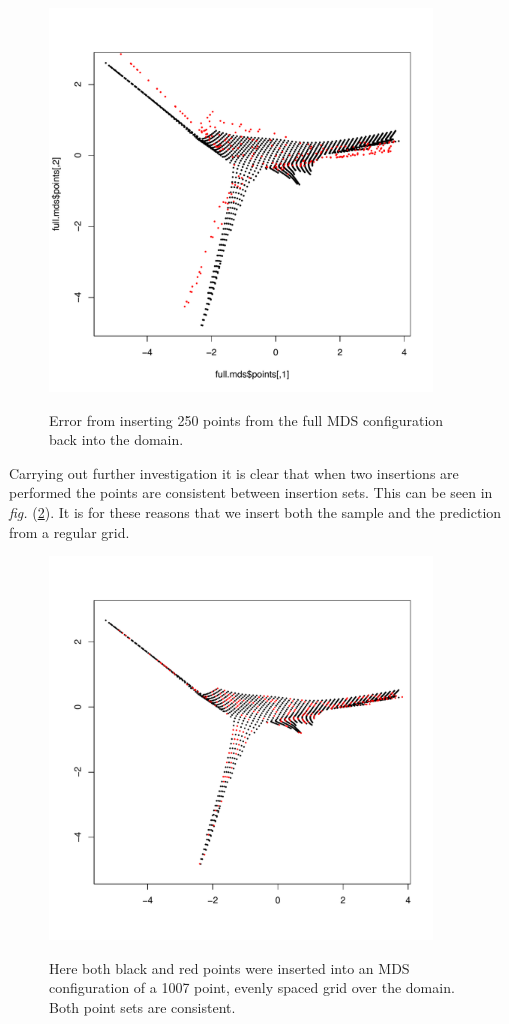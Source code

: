 \documentclass[a4paper,10pt]{article}
\newcommand{\fig}[1]{\emph{fig.} (\ref{#1})}
\begin{document}
\begin{figure}
\centering
\includegraphics[width=4in]{figs/wt2-gowererr-fullover.pdf} \\
\caption{Error from inserting 250 points from the full MDS configuration back into the domain.}
\label{gowerfullinsert}
\end{figure}

Carrying out further investigation it is clear that when two insertions are performed the points are consistent between insertion sets. This can be seen in \fig{wt2-double-insert}. It is for these reasons that we insert both the sample and the prediction from a regular grid.

\begin{figure}
\centering
\includegraphics[width=4in]{figs/wt2-double-insert.pdf} \\
\caption{Here both black and red points were inserted into an MDS configuration of a 1007 point, evenly spaced grid over the domain. Both point sets are consistent.}
\label{wt2-double-insert}
\end{figure}
\end{document}
